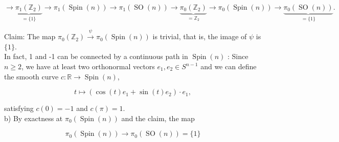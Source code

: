 \documentclass[10pt, letterpaper]{article}
\begin{document}
$$
\rightarrow \underbrace{\pi_{1}\left(\mathbb{Z}_{2}\right)}_{=\{1\}} \rightarrow \pi_{1}(\operatorname{Spin}(n)) \rightarrow \pi_{1}(\operatorname{SO}(n)) \rightarrow \underbrace{\pi_{0}\left(\mathbb{Z}_{2}\right)}_{=\mathbb{Z}_{2}} \rightarrow \pi_{0}(\operatorname{Spin}(n)) \rightarrow \underbrace{\pi_{0}(\operatorname{SO}(n))}_{=\{1\}} .
$$

Claim: The map $\pi_{0}\left(\mathbb{Z}_{2}\right) \xrightarrow{\psi} \pi_{0}(\operatorname{Spin}(n))$ is trivial, that is, the image of $\psi$ is $\{1\}$.\\
In fact, 1 and -1 can be connected by a continuous path in $\operatorname{Spin}(n)$ : Since $n \geq 2$, we have at least two orthonormal vectors $e_{1}, e_{2} \in S^{n-1}$ and we can define the smooth curve $c: \mathbb{R} \rightarrow \operatorname{Spin}(n)$,

$$
t \mapsto\left(\cos (t) e_{1}+\sin (t) e_{2}\right) \cdot e_{1},
$$

satisfying $c(0)=-1$ and $c(\pi)=1$.\\
b) By exactness at $\pi_{0}(\operatorname{Spin}(n))$ and the claim, the map

$$
\pi_{0}(\operatorname{Spin}(n)) \rightarrow \pi_{0}(\operatorname{SO}(n))=\{1\}
$$
\end{document}
